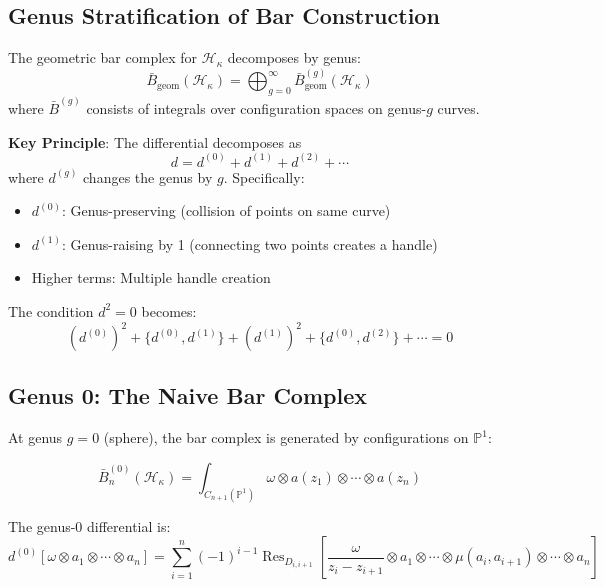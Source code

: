 \subsection{Genus Stratification of Bar Construction}

The geometric bar complex for $\mathcal{H}_\kappa$ decomposes by genus:
\begin{equation}
\bar{B}_{\text{geom}}(\mathcal{H}_\kappa) = \bigoplus_{g=0}^\infty \bar{B}^{(g)}_{\text{geom}}(\mathcal{H}_\kappa)
\end{equation}
where $\bar{B}^{(g)}$ consists of integrals over configuration spaces on genus-$g$ curves.

\textbf{Key Principle}: The differential decomposes as
\begin{equation}
d = d^{(0)} + d^{(1)} + d^{(2)} + \cdots
\end{equation}
where $d^{(g)}$ changes the genus by $g$. Specifically:
\begin{itemize}
\item $d^{(0)}$: Genus-preserving (collision of points on same curve)
\item $d^{(1)}$: Genus-raising by 1 (connecting two points creates a handle)
\item Higher terms: Multiple handle creation
\end{itemize}

The condition $d^2 = 0$ becomes:
\begin{equation}
(d^{(0)})^2 + \{d^{(0)}, d^{(1)}\} + (d^{(1)})^2 + \{d^{(0)}, d^{(2)}\} + \cdots = 0
\end{equation}

\subsection{Genus 0: The Naive Bar Complex}

At genus $g=0$ (sphere), the bar complex is generated by configurations on $\mathbb{P}^1$:

\begin{equation}
\bar{B}^{(0)}_n(\mathcal{H}_\kappa) = \int_{C_{n+1}(\mathbb{P}^1)} \omega \otimes a(z_1) \otimes \cdots \otimes a(z_n)
\end{equation}

The genus-0 differential is:
\begin{equation}
d^{(0)}[\omega \otimes a_1 \otimes \cdots \otimes a_n] = \sum_{i=1}^n (-1)^{i-1} \operatorname{Res}_{D_{i,i+1}} \left[ \frac{\omega}{z_i - z_{i+1}} \otimes a_1 \otimes \cdots \otimes \mu(a_i, a_{i+1}) \otimes \cdots \otimes a_n \right]
\end{equation}

